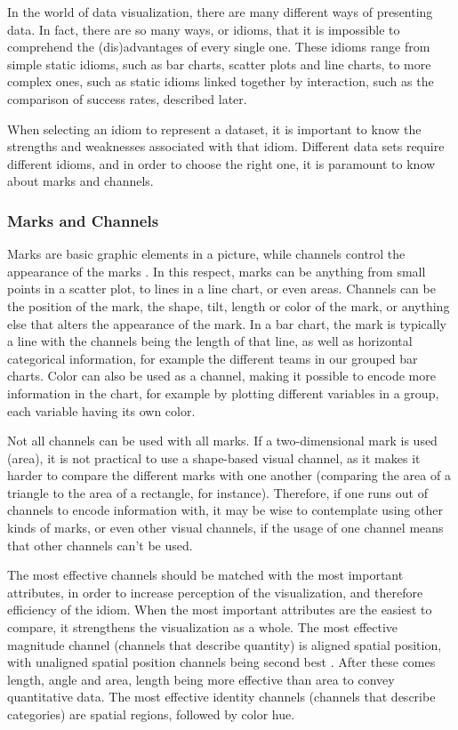 \documentclass[Report.tex]{subfiles}
\begin{document}
In the world of data visualization, there are many different ways of presenting
data. In fact, there are so many ways, or idioms, that it is impossible to
comprehend the (dis)advantages of every single one. These idioms range from
simple static idioms, such as bar charts, scatter plots and line charts, to
more complex ones, such as static idioms linked together by interaction, such as
the comparison of success rates, described later. 

When selecting an idiom to represent a dataset, it is important to know the
strengths and weaknesses associated with that idiom. Different data sets
require different idioms, and in order to choose the right one, it is paramount
to know about marks and channels. 

\subsubsection{Marks and Channels}
Marks are basic graphic elements in a picture, while channels control the
appearance of the marks \cite[Chapter 5, p. 95-96]{Tamara}. In this respect,
marks can be anything from small points in a scatter plot, to lines in a line
chart, or even areas. Channels can be the position of the mark, the shape, tilt,
length or color of the mark, or anything else that alters the appearance of the
mark.
In a bar chart, the mark is typically a line with the channels being the length
of that line, as well as horizontal categorical information, for example the
different teams in our grouped bar charts. Color can also be used as a channel,
making it possible to encode more information in the chart, for example by
plotting different variables in a group, each variable having its own color. 

Not all channels can be used with all marks. If a two-dimensional mark is used
(area), it is not practical to use a shape-based visual channel, as it makes it
harder to compare the different marks with one another (comparing the area of a
triangle to the area of a rectangle, for instance). Therefore, if one runs out
of channels to encode information with, it may be wise to contemplate using
other kinds of marks, or even other visual channels, if the usage of one channel
means that other channels can't be used. 

The most effective channels should be matched with the most important
attributes, in order to increase perception of the visualization, and therefore
efficiency of the idiom. When the most important attributes are the easiest to
compare, it strengthens the visualization as a whole. 
The most effective magnitude channel (channels that describe quantity) is
aligned spatial position, with unaligned spatial position channels being second
best \cite[Chapter 5, p. 101]{Tamara}. After these comes length, angle and area,
length being more effective than area to convey quantitative data. 
The most effective identity channels (channels that describe categories) are
spatial regions, followed by color hue.
\end{document}
